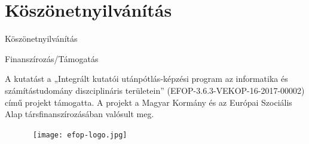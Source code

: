 \chapter*{Köszönetnyilvánítás}

\ifdefined\printName

{{Köszönetnyilvánítás}}

\hfill\break
\hfill\break

\fi

{{Finanszírozás/Támogatás}}

A kutatást a „Integrált kutatói utánpótlás-képzési program az informatika és számítástudomány diszciplináris területein” (EFOP-3.6.3-VEKOP-16-2017-00002) című projekt támogatta. 
A projekt a Magyar Kormány és az Európai Szociális Alap társfinanszírozásában valósult meg.

\begin{figure}[b]
    \hbox{\hspace{26em} \texttt{[image: efop-logo.jpg]}}
\end{figure}
